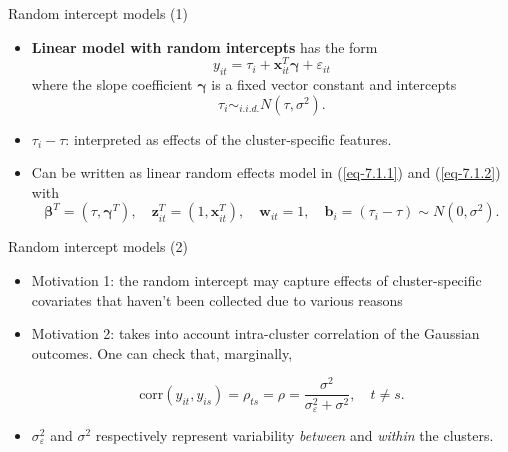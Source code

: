 \documentclass{beamer}
\newcommand{\boldbeta}{{\boldsymbol \beta}}
\newcommand{\boldgamma}{{\boldsymbol \gamma}}
\newenvironment{wideitemize}%
  {\begin{itemize}%
    \setlength{\parskip}{1em}}%
  {\end{itemize}}
\begin{document}
\begin{frame}{Random intercept models (1) }
\begin{wideitemize}
\item \textbf{Linear model with random intercepts} has the form 
\begin{equation}
y_{it}=\tau_i+\mathbf{x}_{it}^T\boldgamma+\varepsilon_{it}
\label{eq-7.1.6}
\end{equation}
where the slope coefficient $\boldgamma$ is a fixed vector constant and intercepts
\[
\tau_i \sim_{i.i.d. } N(\tau , \sigma^2).
\]


\item
 $\tau_i-\tau$:  interpreted as effects of the cluster-specific features.
\item

Can be written as linear random effects model in  (\ref{eq-7.1.1}) and (\ref{eq-7.1.2}) with
$$\boldbeta^T\!=\!(\tau, \boldgamma^T), \quad \mathbf{z}_{it}^T\!=\!(1,
\mathbf{x}_{it}^T), \quad \mathbf{w}_{it}\!=\!1, \quad \mathbf{b}_i\!=\!(\tau_i\!-\!\tau)\sim N(0, \sigma^2).$$
\end{wideitemize}
\end{frame}

\begin{frame}{Random intercept models (2)}
\begin{wideitemize}
\item
Motivation  1: the random intercept may capture effects of  cluster-specific covariates that haven't been collected due
to various reasons 

\item
Motivation  2:  takes into account intra-cluster correlation of the Gaussian outcomes. One can  check that, marginally, 

\[
\mbox{corr}(y_{it}, y_{is})=\rho_{ts}=\rho=\frac{\sigma^2}{\sigma^2_\varepsilon +\sigma^2}, \quad t\neq s.
\]

\item
$\sigma^2_\varepsilon$ and $\sigma^2$ respectively represent
 variability \textit{between} and \textit{within} the clusters.
\end{wideitemize}
\end{frame}
\end{document}
